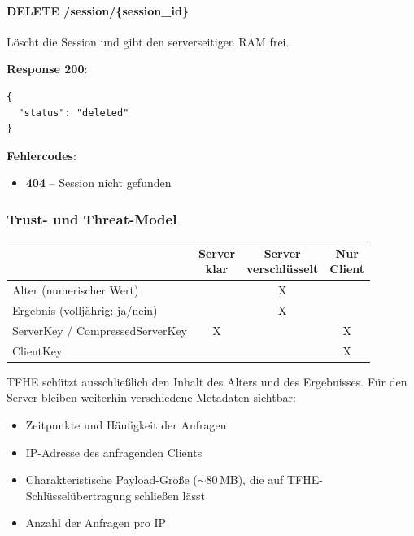 \paragraph{DELETE /session/\{session\_id\}}

Löscht die Session und gibt den serverseitigen RAM frei.

\textbf{Response 200}:
\begin{lstlisting}
{
  "status": "deleted"
}
\end{lstlisting}

\textbf{Fehlercodes}:
\begin{itemize}
  \item \textbf{404} -- Session nicht gefunden
\end{itemize}

\subsubsection{Trust- und Threat-Model}

\begin{table}[H]
\centering
\begin{tabular}{||l|c|c|c||}
    \hline
    & \makecell{\textbf{Server}\\\textbf{klar}} & \makecell{\textbf{Server}\\\textbf{verschlüsselt}} & \makecell{\textbf{Nur}\\\textbf{Client}} \\
    \hline\hline
    Alter (numerischer Wert) & & X & \\
    \hline
    Ergebnis (volljährig: ja/nein) & & X & \\
    \hline
    ServerKey / CompressedServerKey & X & & X \\
    \hline
    ClientKey & & & X \\
    \hline
\end{tabular}
\end{table}

TFHE schützt ausschließlich den Inhalt des Alters und des Ergebnisses. Für den Server bleiben weiterhin verschiedene Metadaten sichtbar:
\begin{itemize}
    \item Zeitpunkte und Häufigkeit der Anfragen
    \item IP-Adresse des anfragenden Clients
    \item Charakteristische Payload-Größe (${\sim}80$\,MB), die auf TFHE-Schlüsselübertragung schließen lässt
    \item Anzahl der Anfragen pro IP
\end{itemize}

